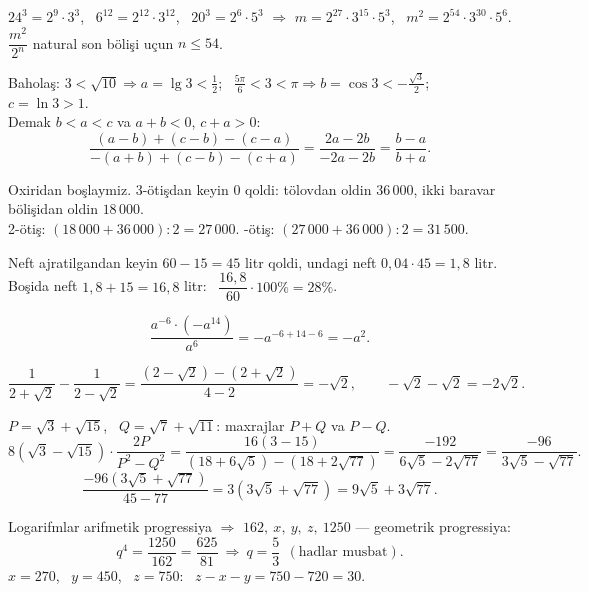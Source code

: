 




$24^3=2^9\cdot3^3$, \ $6^{12}=2^{12}\cdot3^{12}$, \ $20^3=2^6\cdot5^3$ $\Rightarrow$ $m=2^{27}\cdot3^{15}\cdot5^3$, \ $m^2=2^{54}\cdot3^{30}\cdot5^6$.\\
$\dfrac{m^2}{2^n}$ natural son bölişi uçun $n\le54$.

Baholaş: $3<\sqrt{10}\Rightarrow a=\lg3<\frac12$; \ $\frac{5\pi}6<3<\pi\Rightarrow b=\cos3<-\frac{\sqrt3}2$; \ $c=\ln3>1$.\\
Demak $b<a<c$ va $a+b<0$, $c+a>0$:
\[\frac{(a-b)+(c-b)-(c-a)}{-(a+b)+(c-b)-(c+a)}=\frac{2a-2b}{-2a-2b}=\frac{b-a}{b+a}.\]

Oxiridan boşlaymiz. 3-ötişdan keyin $0$ qoldi: tölovdan oldin $36\,000$, ikki baravar bölişidan oldin $18\,000$.\\
2-ötiş: $(18\,000+36\,000):2=27\,000$. -ötiş: $(27\,000+36\,000):2=31\,500$.

Neft ajratilgandan keyin $60-15=45$ litr qoldi, undagi neft $0{,}04\cdot45=1{,}8$ litr.\\
Boşida neft $1{,}8+15=16{,}8$ litr: \ $\dfrac{16{,}8}{60}\cdot100\%=28\%$.

\[\frac{a^{-6}\cdot\left(-a^{14}\right)}{a^6}=-a^{-6+14-6}=-a^2.\]

\[\frac1{2+\sqrt2}-\frac1{2-\sqrt2}=\frac{(2-\sqrt2)-(2+\sqrt2)}{4-2}=-\sqrt2,\qquad -\sqrt2-\sqrt2=-2\sqrt2.\]

$P=\sqrt3+\sqrt{15}$, \ $Q=\sqrt7+\sqrt{11}$: maxrajlar $P+Q$ va $P-Q$.
\[8(\sqrt3-\sqrt{15})\cdot\frac{2P}{P^2-Q^2}=\frac{16(3-15)}{(18+6\sqrt5)-(18+2\sqrt{77})}=\frac{-192}{6\sqrt5-2\sqrt{77}}=\frac{-96}{3\sqrt5-\sqrt{77}}.\]
\[\frac{-96\left(3\sqrt5+\sqrt{77}\right)}{45-77}=3\left(3\sqrt5+\sqrt{77}\right)=9\sqrt5+3\sqrt{77}.\]

Logarifmlar arifmetik progressiya $\Rightarrow$ $162,\ x,\ y,\ z,\ 1250$ — geometrik progressiya:
\[q^4=\frac{1250}{162}=\frac{625}{81}\ \Rightarrow\ q=\frac53\ \ (\text{hadlar musbat}).\]
$x=270$, \ $y=450$, \ $z=750$: \ $z-x-y=750-720=30$.

